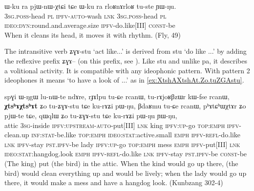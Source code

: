 \documentclass[oldfontcommands,oneside,a4paper,11pt]{article}
\newcommand{\ipa}[1]{{\phon \mbox{#1}}} %
\begin{document}
\begin{exe}
\ex \label{ex:rloR.nA.rloR}
\gll
\ipa{ɯ-ku} 	\ipa{ra} 	\ipa{pjɯ-nɯ-χtɕi} 	\ipa{tɕe} 	\ipa{ɯ-ku} 	\ipa{ra} 	\ipa{rloʁnɤrloʁ} 	\ipa{tu-ste} 	\ipa{ɲɯ-ŋu.} \\
\textsc{3sg.poss}-head \textsc{pl} \textsc{ipfv-auto}-wash \textsc{lnk} \textsc{3sg.poss}-head \textsc{pl}  \textsc{ideo:dyn}:round.and.average.size \textsc{ipfv}-do.like[III] \textsc{const}-be \\ 
\glt When it cleans its head, it moves it with rhythm. (Fly, 49)
\end{exe}

The intransitive verb  \ipa{ʑɣɤ-stu} `act like...' is derived from \ipa{stu} `do like ...' by adding the reflexive prefix \ipa{ʑɣɤ--} (on this prefix, see \citealt{jacques10refl}). Like \ipa{stu} and unlike \ipa{pa}, it describes a volitional activity. It is compatible with any ideophonic pattern. With pattern 2 ideophones it means `to have a look of ...' as in \ref{ex:XtshAXtshAt.Zo.tuZGAstu}.

\begin{exe}
\ex \label{ex:XtshAXtshAt.Zo.tuZGAstu}
\gll
\ipa{spɣi} 	\ipa{ɯ-ŋgɯ} 	\ipa{lu-nɯ-te} 	\ipa{ndɤre,} 	 	\ipa{rɟɤlpu} 	\ipa{tu-ɕe} 	\ipa{rcanɯ,} 	\ipa{tu-rɤjoʁβzɯr} 	\ipa{kɯ-fse} 	\ipa{rcanɯ,} 	\ipa{\textbf{χtsʰɤχtsʰɤt}} 	\ipa{ʑo} 	\ipa{tu-ʑɣɤ-stu} 	\ipa{tɕe} 	\ipa{ku-rɤʑi} 	\ipa{pɯ-ŋu,} 	\ipa{βdaʁmu} 	\ipa{tu-ɕe} 	\ipa{rcanɯ,} 	\ipa{pʰɤtɕʰɯχtɤr} 	\ipa{ʑo} 	\ipa{pjɯ-te} 	\ipa{tɕe,} 	\ipa{qɯqlɯ} 	\ipa{ʑo} 	\ipa{tu-ʑɣɤ-stu} 	\ipa{tɕe} 	\ipa{ku-rɤʑi} 	\ipa{pɯ-ŋu} 	\ipa{ɲɯ-ŋu,} 	\\
attic \textsc{3sg}-inside \textsc{ipfv:upstream-auto}-put[III] \textsc{lnk} king  \textsc{ipfv:up}-go \textsc{top:emph} \textsc{ipfv}-clean.up \textsc{inf:stat}-be.like  \textsc{top:emph} \textsc{ideo:stat}:active.small \textsc{emph} \textsc{ipfv-refl}-do.like \textsc{lnk} \textsc{ipfv}-stay \textsc{pst.ipfv}-be  lady  \textsc{ipfv:up}-go \textsc{top:emph} mess \textsc{emph} \textsc{ipfv}-put[III] \textsc{lnk} \textsc{ideo:stat}:hangdog.look \textsc{emph} \textsc{ipfv-refl}-do.like \textsc{lnk} \textsc{ipfv}-stay \textsc{pst.ipfv}-be \textsc{const}-be \\
\glt (The king) put (the bird) in the attic. When the kind would go up there, (the bird) would clean everything up and would be lively; when the lady would go up there, it would make a mess and have a hangdog look. (Kunbzang 302-4)
\end{exe}
\end{document}
